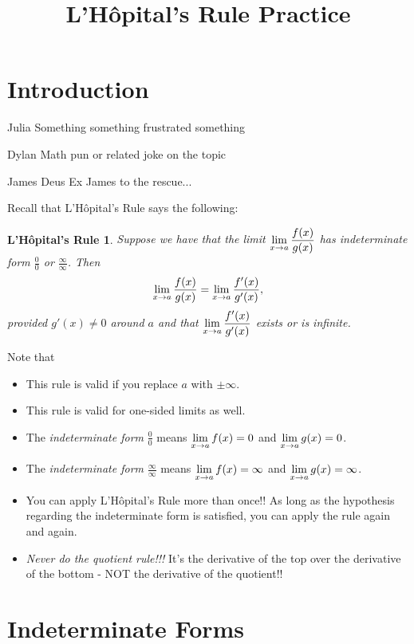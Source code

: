 \documentclass{ximera}
\title{L'H\^{o}pital's Rule Practice}
\newtheorem*{LRule}{L'H\^{o}pital's Rule}
\newcommand{\LHop}{L'H\^{o}pital}
\begin{document}
\maketitle

\section{Introduction}
\begin{dialogue}
    \item[Julia] Something something frustrated something
    \item[Dylan] Math pun or related joke on the topic
    \item[James] Deus Ex James to the rescue...
\end{dialogue}

Recall that \LHop's Rule says the following:

\begin{LRule}
    Suppose we have that the limit $\displaystyle \lim_{x \to a} \displaystyle\frac{f(x)}{g(x)}$ has indeterminate form $\frac{0}{0}$ or $\frac{\infty}{\infty}$. Then
    \[
        \displaystyle \lim_{x \to a} \displaystyle\frac{f(x)}{g(x)} = \displaystyle \lim_{x \to a} \displaystyle\frac{f'(x)}{g'(x)},
    \]
provided $g'(x) \neq 0$ around $a$ and that $\displaystyle \lim_{x \to a} \displaystyle\frac{f'(x)}{g'(x)}$ exists or is infinite.
\end{LRule}


Note that
    \begin{itemize}
        \item This rule is valid if you replace $a$ with $\pm \infty$.
        \item This rule is valid for one-sided limits as well.
        \item The \emph{indeterminate form} $\frac{0}{0}$ means $\displaystyle \lim_{x \to a} f(x) = 0$ and $\displaystyle \lim_{x \to a} g(x) = 0$.
        \item The \emph{indeterminate form} $\frac{\infty}{\infty}$ means $\displaystyle \lim_{x \to a} f(x) = \infty$ and $\displaystyle \lim_{x \to a} g(x) = \infty$.
        \item You can apply L'H\^{o}pital's Rule more than once!! As long as the hypothesis regarding the indeterminate form is satisfied, you can apply the rule again and again.
        \item \emph{Never do the quotient rule!!!} It's the derivative of the top over the derivative of the bottom - NOT the derivative of the quotient!!
    \end{itemize} 


\section*{Indeterminate Forms}
\end{document}
